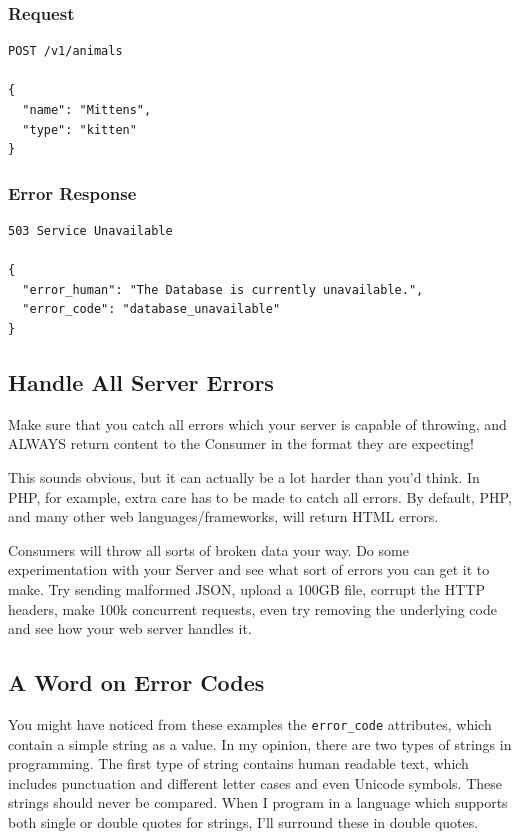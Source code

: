 \documentclass{book}
\begin{document}
\subsubsection{Request}

\begin{verbatim}
POST /v1/animals

{
  "name": "Mittens",
  "type": "kitten"
}
\end{verbatim}

\subsubsection{Error Response}

\begin{verbatim}
503 Service Unavailable

{
  "error_human": "The Database is currently unavailable.",
  "error_code": "database_unavailable"
}
\end{verbatim}

\subsection{Handle All Server Errors}

Make sure that you catch all errors which your server is capable of throwing, and ALWAYS return content to the Consumer in the format they are expecting!

This sounds obvious, but it can actually be a lot harder than you'd think. In PHP, for example, extra care has to be made to catch all errors. By default, PHP, and many other web languages/frameworks, will return HTML errors.

Consumers will throw all sorts of broken data your way. Do some experimentation with your Server and see what sort of errors you can get it to make. Try sending malformed JSON, upload a 100GB file, corrupt the HTTP headers, make 100k concurrent requests, even try removing the underlying code and see how your web server handles it.

\subsection{A Word on Error Codes}

You might have noticed from these examples the \texttt{error\_code} attributes, which contain a simple string as a value. In my opinion, there are two types of strings in programming. The first type of string contains human readable text, which includes punctuation and different letter cases and even Unicode symbols. These strings should never be compared. When I program in a language which supports both single or double quotes for strings, I'll surround these in double quotes.
\end{document}
